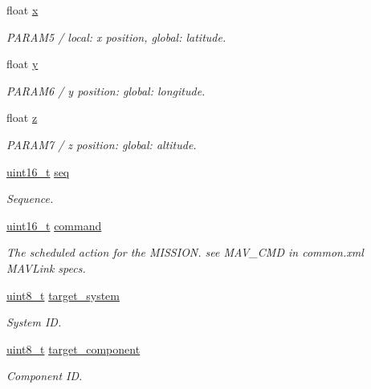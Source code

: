 \begin{DoxyCompactItemize}
float \hyperlink{struct____mavlink__mission__item__t_a578c43dbf85decd47437180c89407f93}{x}
\begin{DoxyCompactList}\small\item\em P\-A\-R\-A\-M5 / local\-: x position, global\-: latitude. \end{DoxyCompactList}\item 
float \hyperlink{struct____mavlink__mission__item__t_a916e8ea61a94ce7b854ebd11cc5eea37}{y}
\begin{DoxyCompactList}\small\item\em P\-A\-R\-A\-M6 / y position\-: global\-: longitude. \end{DoxyCompactList}\item 
float \hyperlink{struct____mavlink__mission__item__t_adfa6844101b755c5e439b46f21ba0be8}{z}
\begin{DoxyCompactList}\small\item\em P\-A\-R\-A\-M7 / z position\-: global\-: altitude. \end{DoxyCompactList}\item 
\hyperlink{stdint_8h_a273cf69d639a59973b6019625df33e30}{uint16\-\_\-t} \hyperlink{struct____mavlink__mission__item__t_a0038a8dc2e0dc3757272b160a0cbaac2}{seq}
\begin{DoxyCompactList}\small\item\em Sequence. \end{DoxyCompactList}\item 
\hyperlink{stdint_8h_a273cf69d639a59973b6019625df33e30}{uint16\-\_\-t} \hyperlink{struct____mavlink__mission__item__t_ad5a94a67caa147049e45c3754f15daa7}{command}
\begin{DoxyCompactList}\small\item\em The scheduled action for the M\-I\-S\-S\-I\-O\-N. see M\-A\-V\-\_\-\-C\-M\-D in common.\-xml M\-A\-V\-Link specs. \end{DoxyCompactList}\item 
\hyperlink{stdint_8h_aba7bc1797add20fe3efdf37ced1182c5}{uint8\-\_\-t} \hyperlink{struct____mavlink__mission__item__t_ab6e5076aa5f0e524e88879bebf0ed483}{target\-\_\-system}
\begin{DoxyCompactList}\small\item\em System I\-D. \end{DoxyCompactList}\item 
\hyperlink{stdint_8h_aba7bc1797add20fe3efdf37ced1182c5}{uint8\-\_\-t} \hyperlink{struct____mavlink__mission__item__t_a6bb8183ef3416741edca46337e6e6860}{target\-\_\-component}
\begin{DoxyCompactList}\small\item\em Component I\-D. \end{DoxyCompactList}\item 

\end{DoxyCompactItemize}
